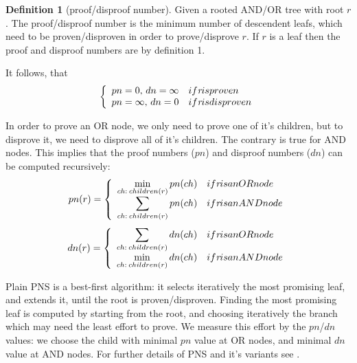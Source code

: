 \documentclass[conference]{IEEEtran}
\theoremstyle{definition}
\newtheorem{definition}{Definition}[section]
\newcommand{\pn}{$pn$\xspace}
\newcommand{\dn}{$dn$\xspace}
\begin{document}
\begin{definition}[proof/disproof number]
Given a rooted AND/OR tree with root $r$. The proof/disproof number is the minimum number of descendent leafs, which need to be proven/disproven in order to prove/disprove $r$. If $r$ is a leaf 
then the proof and disproof numbers are by definition 1.
\end{definition}

It follows, that
\begin{align*}
\left\{
	\begin{array}{ll}
		pn=0,\, dn=\infty  & \mbox{if \textit{r} is proven}\\
		pn=\infty,\, dn=0  & \mbox{if \textit{r} is disproven}\\
	\end{array}
\right.
\end{align*}

In order to prove an OR node, we only need to prove one of it's children, but to disprove it, we need to disprove all of it's children.
The contrary is true for AND nodes.
This implies that the proof numbers (\pn) and disproof numbers (\dn) can be computed recursively:
\begin{align*}
pn(r) =
\left\{
	\begin{array}{ll}
		\displaystyle \min_{ch: \:  children(r)}pn(ch)  & \mbox{if \textit{r} is an OR node}\\
		\displaystyle \sum_{ch: \:  children(r)}pn(ch)  & \mbox{if \textit{r} is an AND node}\\
	\end{array}
\right.
\end{align*}
\begin{align*}
dn(r) =
\left\{
	\begin{array}{ll}
		\displaystyle \sum_{ch: \:  children(r)}dn(ch)  & \mbox{if \textit{r} is an OR node}\\
		\displaystyle \min_{ch: \:  children(r)}dn(ch)  & \mbox{if \textit{r} is an AND node}\\
	\end{array}
\right.
\end{align*}

Plain PNS is a best-first algorithm: it selects iteratively the most promising leaf, and extends it, until the root is proven/disproven.
Finding the most promising leaf is computed by starting from the root, and choosing iteratively the branch which may need the least effort to prove.
We measure this effort by the \pn/\dn values: we choose the child with minimal \pn value at OR nodes, and minimal \dn value at AND nodes. For further details of PNS and it's variants see \cite{PNS_variants}.
\end{document}
